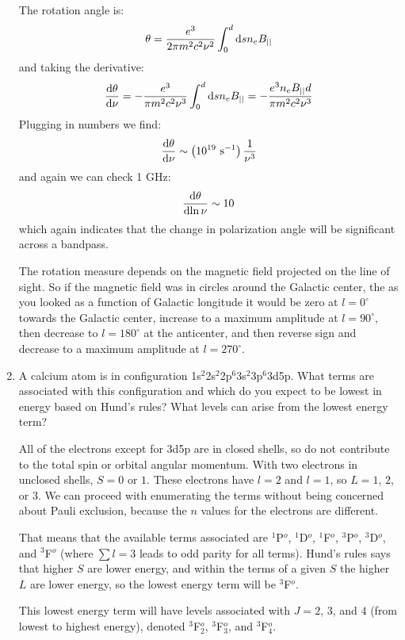 \documentclass[11pt, preprint]{article}
\begin{document}
\begin{enumerate}
\begin{answer}
    The rotation angle is:
    \begin{equation}
      \theta = \frac{e^3}{2\pi m^2 c^2 \nu^2} \int_0^d {\rm d}s n_e
        B_{||}
    \end{equation}
    and taking the derivative:
    \begin{equation}
      \frac{{\rm d}\theta}{{\rm d}\nu} =
      - \frac{e^3}{\pi m^2 c^2 \nu^3} \int_0^d {\rm d}s n_e
        B_{||} = 
      - \frac{e^3n_e B_{||} d}{\pi m^2 c^2 \nu^3}
    \end{equation}
    Plugging in numbers we find:
    \begin{equation}
      \frac{{\rm d}\theta}{{\rm d}{\nu}} \sim \left(10^{19} {\rm
        ~s}^{-1}\right) \frac{1}{\nu^3}
    \end{equation}
    and again we can check 1 GHz:
    \begin{equation}
      \frac{{\rm d}\theta}{{\rm d}{\ln\nu}} \sim 10
    \end{equation}
    which again indicates that the change in polarization angle will
    be significant across a bandpass.

    The rotation measure depends on the magnetic field projected on
    the line of sight. So if the magnetic field was in circles around
    the Galactic center, the as you looked as a function of Galactic
    longitude it would be zero at $l=0^\circ$ towards the Galactic
    center, increase to a maximum amplitude at $l=90^\circ$, then decrease to
    $l=180^\circ$ at the anticenter, and then reverse sign and
    decrease to a maximum amplitude at $l=270^\circ$.
    
  \end{answer}
\item A calcium atom is in configuration
  1s$^2$2s$^2$2p$^6$3s$^2$3p$^6$3d5p. What terms are associated with
  this configuration and which do you expect to be lowest in energy
  based on Hund's rules? What levels can arise from the lowest energy
  term?

  \begin{answer}
   All of the electrons except for 3d5p are in closed shells, so do
   not contribute to the total spin or orbital angular momentum. With
   two electrons in unclosed shells, $S=0$ or $1$. These electrons
   have $l=2$ and $l=1$, so $L=1$, $2$, or $3$. We can proceed with
   enumerating the terms without being concerned about Pauli
   exclusion, because the $n$ values for the electrons are
   different.

   That means that the available terms associated are ${}^1$P$^o$,
   ${}^1$D$^o$, ${}^1$F$^o$, ${}^3$P$^o$, ${}^3$D$^o$, and ${}^3$F$^o$
   (where $\sum l = 3$ leads to odd parity for all terms). Hund's
   rules says that higher $S$ are lower energy, and within the terms
   of a given $S$ the higher $L$ are lower energy, so the lowest
   energy term will be ${}^3$F$^o$.

   This lowest energy term will have levels associated with $J=2$,
   $3$, and $4$ (from lowest to highest energy), denoted
   ${}^3$F$^o_2$, ${}^3$F$^o_3$, and ${}^3$F$^o_4$.
  \end{answer}
\end{enumerate}
\end{document}
